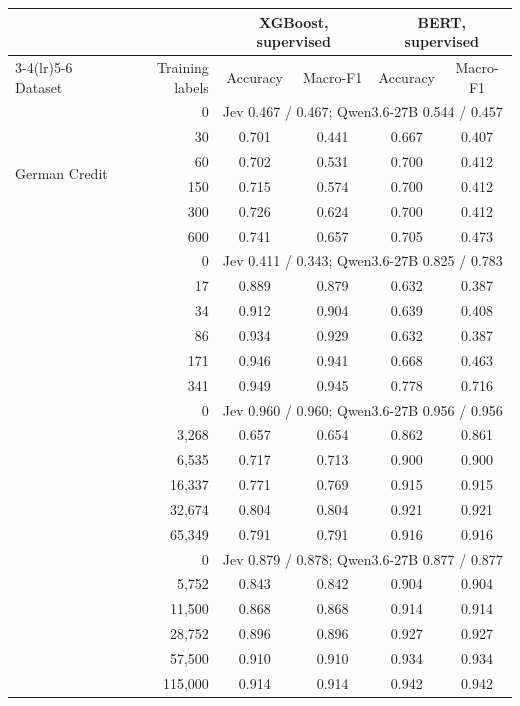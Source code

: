\begin{tabular}{lrcccc}
\toprule
 & & \multicolumn{2}{c}{XGBoost, supervised} & \multicolumn{2}{c}{BERT, supervised} \\
\cmidrule(lr){3-4}\cmidrule(lr){5-6}
Dataset & Training labels & Accuracy & Macro-F1 & Accuracy & Macro-F1 \\
\midrule
\multirow{6}{*}{German Credit} & 0 & \multicolumn{4}{l}{Jev 0.467 / 0.467; Qwen3.6-27B 0.544 / 0.457} \\
 & 30 & 0.701 & 0.441 & 0.667 & 0.407 \\
 & 60 & 0.702 & 0.531 & 0.700 & 0.412 \\
 & 150 & 0.715 & 0.574 & 0.700 & 0.412 \\
 & 300 & 0.726 & 0.624 & 0.700 & 0.412 \\
 & 600 & 0.741 & 0.657 & 0.705 & 0.473 \\
\addlinespace
\multirow{6}{*}{Breast Cancer Wisconsin} & 0 & \multicolumn{4}{l}{Jev 0.411 / 0.343; Qwen3.6-27B 0.825 / 0.783} \\
 & 17 & 0.889 & 0.879 & 0.632 & 0.387 \\
 & 34 & 0.912 & 0.904 & 0.639 & 0.408 \\
 & 86 & 0.934 & 0.929 & 0.632 & 0.387 \\
 & 171 & 0.946 & 0.941 & 0.668 & 0.463 \\
 & 341 & 0.949 & 0.945 & 0.778 & 0.716 \\
\addlinespace
\multirow{6}{*}{SST-2} & 0 & \multicolumn{4}{l}{Jev 0.960 / 0.960; Qwen3.6-27B 0.956 / 0.956} \\
 & 3{,}268 & 0.657 & 0.654 & 0.862 & 0.861 \\
 & 6{,}535 & 0.717 & 0.713 & 0.900 & 0.900 \\
 & 16{,}337 & 0.771 & 0.769 & 0.915 & 0.915 \\
 & 32{,}674 & 0.804 & 0.804 & 0.921 & 0.921 \\
 & 65{,}349 & 0.791 & 0.791 & 0.916 & 0.916 \\
\addlinespace
\multirow{6}{*}{AG News} & 0 & \multicolumn{4}{l}{Jev 0.879 / 0.878; Qwen3.6-27B 0.877 / 0.877} \\
 & 5{,}752 & 0.843 & 0.842 & 0.904 & 0.904 \\
 & 11{,}500 & 0.868 & 0.868 & 0.914 & 0.914 \\
 & 28{,}752 & 0.896 & 0.896 & 0.927 & 0.927 \\
 & 57{,}500 & 0.910 & 0.910 & 0.934 & 0.934 \\
 & 115{,}000 & 0.914 & 0.914 & 0.942 & 0.942 \\
\bottomrule
\end{tabular}
